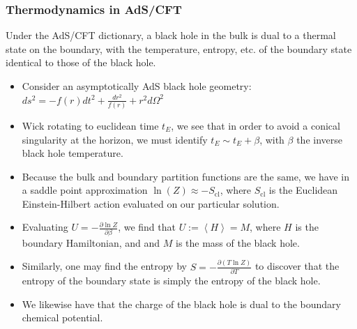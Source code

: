 \documentclass[8pt,aspectratio=169]{beamer}
\newcommand{\expVal}[1]{\left< #1 \right>}
\begin{document}
\begin{frame}
\frametitle{Thermodynamics in AdS/CFT}

Under the AdS/CFT dictionary, a black hole in the bulk is dual to a thermal state on the boundary, with the temperature, entropy, etc. of the boundary state identical to those of the black hole.

\begin{itemize}

\item Consider an asymptotically AdS black hole geometry: $ds^2 = - f(r) dt^2 + \frac{dr^2}{f(r)} + r^2 d\Omega^2$

\item Wick rotating to euclidean time $t_E$, we see that in order to avoid a conical singularity at the horizon, we must identify $t_E \sim t_E + \beta$, with $\beta$ the inverse black hole temperature. 

\item Because the bulk and boundary partition functions are the same, we have in a saddle point approximation $\ln(Z) \approx - S_\text{cl}$, where $S_\text{cl}$ is the Euclidean Einstein-Hilbert action evaluated on our particular solution.

\item Evaluating $U = - \frac{\partial \ln Z}{\partial \beta}$, we find that $U := \expVal{H} = M$, where $H$ is the boundary Hamiltonian, and and $M$ is the mass of the black hole.

\item Similarly, one may find the entropy by $S = -\frac{\partial (T \ln Z)}{\partial T}$ to discover that the entropy of the boundary state is simply the entropy of the black hole.

\item We likewise have that the charge of the black hole is dual to the boundary chemical potential.

\end{itemize}

\end{frame}
\end{document}
